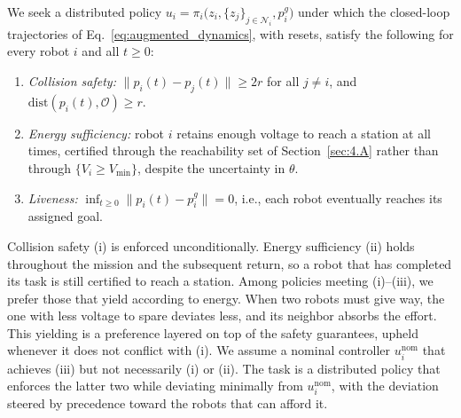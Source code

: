 \begin{problem}\label{prob:main}
We seek a distributed policy $u_i=\pi_i\big(z_i, \{z_j\}_{j\in\mathcal{N}_i}, p_i^g\big)$ under which the closed-loop trajectories of Eq.~\eqref{eq:augmented_dynamics}, with resets, satisfy the following for every robot $i$ and all $t \geq 0$:
\begin{enumerate}
    \item \textit{Collision safety:} $\|p_i(t) - p_j(t)\| \geq 2r$ for all $j\neq i$, and $\mathrm{dist}(p_i(t), \mathcal{O})\ge r$.
    \item \textit{Energy sufficiency:} robot $i$ retains enough voltage to reach a station at all times, certified through the reachability set of Section~\ref{sec:4.A} rather than through $\{V_i \geq V_{\min}\}$, despite the uncertainty in $\theta$.
    \item \textit{Liveness:} $\inf_{t\geq 0} \|p_i(t) - p_i^g
    \|=0$, i.e., each robot eventually reaches its assigned goal.
\end{enumerate}
\end{problem}

Collision safety (i) is enforced unconditionally.
Energy sufficiency (ii) holds throughout the mission and the subsequent return, so a robot that has completed its task is still certified to reach a station. 
Among policies meeting (i)–(iii), we prefer those that yield according to energy.
When two robots must give way, the one with less voltage to spare deviates less, and its neighbor absorbs the effort. 
This yielding is a preference layered on top of the safety guarantees, upheld whenever it does not conflict with (i).
We assume a nominal controller $u_i^\mathrm{nom}$ that achieves (iii) but not necessarily (i) or (ii). 
The task is a distributed policy that enforces the latter two while deviating minimally from $u_i^\mathrm{nom}$, with the deviation steered by precedence toward the robots that can afford it.